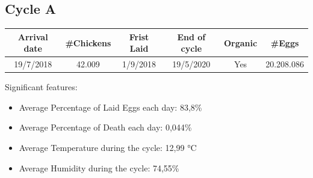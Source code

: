 \documentclass[11pt]{article}
\begin{document}
\subsection{Cycle A}
\begin{center}
    \begin{tabular}{|c | c | c | c | c | c|} 
        \hline
        \textbf{Arrival date} & \textbf{\#Chickens} & \textbf{Frist Laid} & \textbf{End of cycle} & \textbf{Organic} & \textbf{\#Eggs}\\ [0.5ex] 
        \hline
        19/7/2018 & 42.009 & 1/9/2018 & 19/5/2020 & Yes & 20.208.086\\
        \hline
    \end{tabular}
\end{center}
Significant features:
\begin{itemize}
    \item Average Percentage of Laid Eggs each day: 83,8\%
    \item Average Percentage of Death each day: 0,044\%
    \item Average Temperature during the cycle: 12,99 °C
    \item Average Humidity during the cycle: 74,55\%
\end{itemize}
\end{document}
